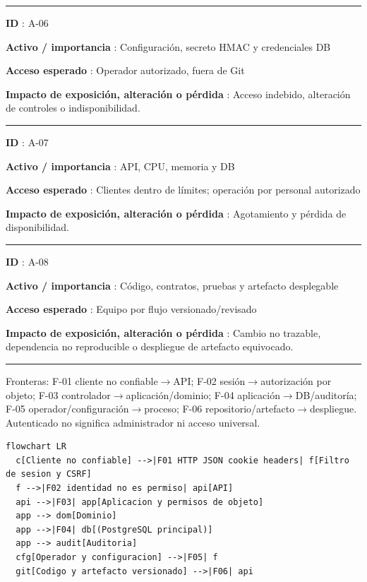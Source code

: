 \documentclass[12pt,a4paper]{report}
\begin{document}
\medskip\hrule\medskip

\textbf{ID }: A-06

\textbf{Activo / importancia }: Configuración, secreto HMAC y
credenciales DB

\textbf{Acceso esperado }: Operador autorizado, fuera de Git

\textbf{Impacto de exposición, alteración o pérdida }: Acceso indebido,
alteración de controles o indisponibilidad.

\medskip\hrule\medskip

\textbf{ID }: A-07

\textbf{Activo / importancia }: API, CPU, memoria y DB

\textbf{Acceso esperado }: Clientes dentro de límites; operación por
personal autorizado

\textbf{Impacto de exposición, alteración o pérdida }: Agotamiento y
pérdida de disponibilidad.

\medskip\hrule\medskip

\textbf{ID }: A-08

\textbf{Activo / importancia }: Código, contratos, pruebas y artefacto
desplegable

\textbf{Acceso esperado }: Equipo por flujo versionado/revisado

\textbf{Impacto de exposición, alteración o pérdida }: Cambio no
trazable, dependencia no reproducible o despliegue de artefacto
equivocado.

\medskip\hrule\medskip

Fronteras: F-01 cliente no confiable\ensuremath{\rightarrow}API; F-02 sesión\ensuremath{\rightarrow}autorización por
objeto; F-03 controlador\ensuremath{\rightarrow}aplicación/dominio; F-04
aplicación\ensuremath{\rightarrow}DB/auditoría; F-05 operador/configuración\ensuremath{\rightarrow}proceso; F-06
repositorio/artefacto\ensuremath{\rightarrow}despliegue. Autenticado no significa administrador
ni acceso universal.

\begin{Verbatim}[breaklines=true,breakanywhere=true,fontsize=\footnotesize]
flowchart LR
  c[Cliente no confiable] -->|F01 HTTP JSON cookie headers| f[Filtro de sesion y CSRF]
  f -->|F02 identidad no es permiso| api[API]
  api -->|F03| app[Aplicacion y permisos de objeto]
  app --> dom[Dominio]
  app -->|F04| db[(PostgreSQL principal)]
  app --> audit[Auditoria]
  cfg[Operador y configuracion] -->|F05| f
  git[Codigo y artefacto versionado] -->|F06| api
\end{Verbatim}
\end{document}
